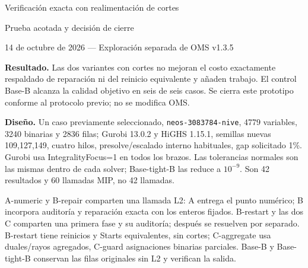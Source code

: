 \documentclass[10pt,a4paper]{article}
\begin{document}
\begin{center}
{\Large Verificación exacta con realimentación de cortes}\par
{\large Prueba acotada y decisión de cierre}\par
14 de octubre de 2026 --- Exploración separada de OMS v1.3.5
\end{center}

\textbf{Resultado.} Las dos variantes con cortes no mejoran el costo exactamente
respaldado de reparación ni del reinicio equivalente y añaden trabajo.
El control Base-B alcanza la calidad objetivo en seis de seis casos.
Se cierra este prototipo conforme al protocolo previo; no se modifica OMS.

\textbf{Diseño.} Un caso previamente seleccionado, \texttt{neos-3083784-nive},
4779 variables, 3240 binarias y 2836 filas; Gurobi 13.0.2 y HiGHS 1.15.1,
semillas nuevas 109,127,149, cuatro hilos, presolve/escalado interno habituales,
gap solicitado 1\%. Gurobi usa IntegralityFocus=1 en todos los brazos.
Las tolerancias normales son las mismas dentro de cada solver; Base-tight-B
las reduce a $10^{-9}$. Son 42 resultados y 60 llamadas MIP, no 42 llamadas.

A-numeric y B-repair comparten una llamada L2: A entrega el punto numérico;
B incorpora auditoría y reparación exacta con los enteros fijados.
B-restart y las dos C comparten una primera fase y su auditoría; después se
resuelven por separado. B-restart tiene reinicios y Starts equivalentes, sin cortes;
C-aggregate usa duales/rayos agregados, C-guard asignaciones binarias parciales.
Base-B y Base-tight-B conservan las filas originales sin L2 y verifican la salida.
\end{document}
